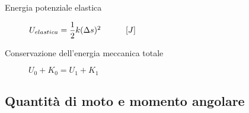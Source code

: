 \documentclass[a4paper,11pt,italian]{article}
\begin{document}
\begin{description}
  \item[Energia potenziale elastica] 
  $ U_{elastica} = \dfrac{1}{2} k (\Delta s)^2 \hspace*{3em} [J] $
  
  \item[Conservazione dell'energia meccanica totale] 
  $ U_0 + K_0 = U_1 + K_1 $
\end{description}



\subsection{Quantità di moto e momento angolare}
\end{document}
